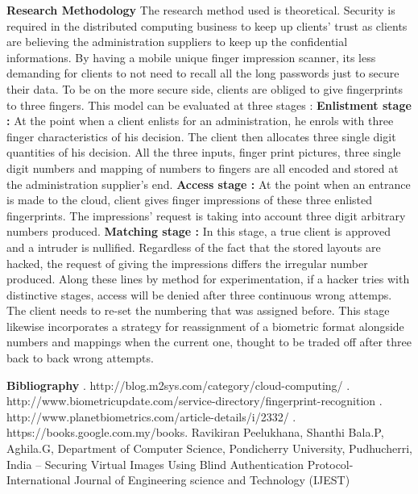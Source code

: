 \documentclass[12pt]{article}
\begin{document}
\textbf{\large Research Methodology} \newline \newline
The research method used is theoretical. Security is required in the distributed computing business to keep up clients' trust as clients are believing the administration suppliers to keep up the confidential informations. By having a mobile unique finger impression scanner, its less demanding for clients to not need to recall all the long passwords just to secure their data. To be on the more secure side, clients are obliged to give fingerprints to three fingers. This model can be evaluated at three stages : \newline \newline
\textbf {Enlistment stage : } At the point when a client enlists for an administration, he enrols with three finger characteristics of his decision. The client then allocates three single digit quantities of his decision. All the three inputs, finger print pictures, three single digit numbers and mapping of numbers to fingers are all encoded and stored at the administration supplier's end. \newline \newline
\textbf {Access stage : } At the point when an entrance is made to the cloud, client gives finger impressions of these three enlisted fingerprints. The impressions' request is taking into account three digit arbitrary numbers produced. \newline \newline
\textbf {Matching stage : } In this stage, a true client is approved and a intruder is nullified. Regardless of the fact that the stored layouts are hacked, the request of giving the impressions differs the irregular number produced. Along these lines by method for experimentation, if a hacker tries with distinctive stages, access will be denied after three continuous wrong attemps. The client needs to re-set the numbering that was assigned before. This stage likewise incorporates a strategy for reassignment of a biometric format alongside numbers and mappings when the current one, thought to be traded off after three back to back wrong attempts.  \newpage

\textbf{\large Bibliography} \newline {}.  http://blog.m2sys.com/category/cloud-computing/ \newline {}.  http://www.biometricupdate.com/service-directory/fingerprint-recognition \newline {}.  http://www.planetbiometrics.com/article-details/i/2332/ \newline {}.  https://books.google.com.my/books\newline {}.  Ravikiran Peelukhana, Shanthi Bala.P, Aghila.G, Department of       
    Computer Science, Pondicherry University, Pudhucherri, India –    
    Securing Virtual Images Using Blind Authentication Protocol-     
    International Journal of Engineering science and Technology (IJEST) 
\end{document}

